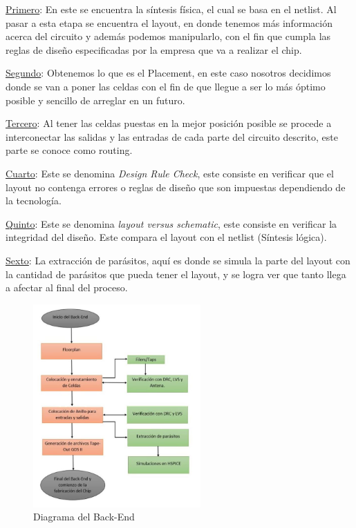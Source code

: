 \underline{Primero}: En este se encuentra la síntesis física, el cual se basa en el netlist. Al pasar a esta etapa se encuentra el layout, en donde tenemos más información acerca del circuito y además podemos manipularlo, con el fin que cumpla las reglas de diseño especificadas por la empresa que va a realizar el chip.

\underline{Segundo}: Obtenemos lo que es el Placement, en este caso nosotros decidimos donde se van a poner las celdas con el fin de que llegue a ser lo más óptimo posible y sencillo de arreglar en un futuro.

\underline{Tercero}: Al tener las celdas puestas en la mejor posición posible se procede a interconectar las salidas y las entradas de cada parte del circuito descrito, este parte se conoce como routing.

\underline{Cuarto}: Este se denomina \textit{Design Rule Check}, este consiste en verificar que el layout no contenga errores o reglas de diseño que son impuestas dependiendo de la tecnología.

\underline{Quinto}: Este se denomina \textit{layout versus schematic}, este consiste en verificar la integridad del diseño. Este compara el layout con el netlist (Síntesis lógica).

\underline{Sexto}: La extracción de parásitos, aquí es donde se simula la parte del layout con la cantidad de parásitos que pueda tener el layout, y se logra ver que tanto llega a afectar al final del proceso.


 \cite{charls} 
\begin{figure}[h]
    \centering
    \includegraphics[width=0.57\textwidth]{figuras/Back.JPG}
    \caption{Diagrama del Back-End}
    \label{fig:mesh1}
\end{figure}
\newpage

